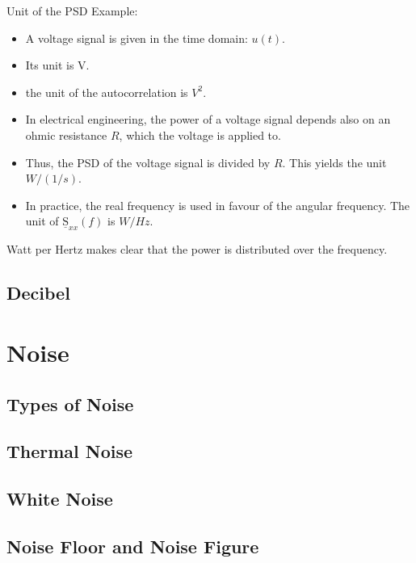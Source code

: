 \begin{refsection}
\begin{excursus}{Unit of the \ac{PSD}}
	Example:
	\begin{itemize}
		\item A voltage signal is given in the time domain: $u(t)$.
		\item Its unit is \si{V}.
		\item the unit of the autocorrelation is $\si{V^2}$.
		\item In electrical engineering, the power of a voltage signal depends also on an ohmic resistance $R$, which the voltage is applied to.
		\item Thus, the \ac{PSD} of the voltage signal is divided by $R$. This yields the unit $\si{W/(1/s)}$.
		\item In practice, the real frequency is used in favour of the angular frequency. The unit of $\underline{\mathrm{S}}_{xx}(f)$ is $\si{W/Hz}$.
	\end{itemize}
	Watt per Hertz makes clear that the power is distributed over the frequency.
\end{excursus}

\subsection{Decibel}

\section{Noise}

\subsection{Types of Noise}

\subsection{Thermal Noise}

\subsection{White Noise}

\subsection{Noise Floor and Noise Figure}

{}
\printbibliography[heading=subbibliography]
\end{refsection}

